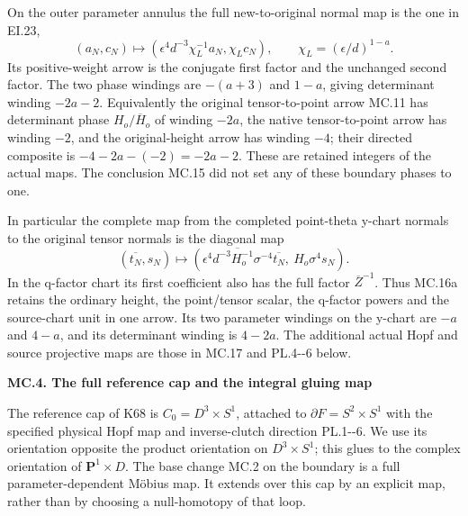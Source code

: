 On the outer parameter annulus the full new-to-original
normal map is the one in EI.23,
\[
 (a_N,c_N)\longmapsto
 (\epsilon^4d^{-3}\chi_L^{-1}a_N,\chi_Lc_N),
 \qquad\chi_L=(\epsilon/d)^{1-a}.                       \tag{MC.16}
\]
Its positive-weight arrow is the conjugate first factor
and the unchanged second factor. The two phase windings
are \(-(a+3)\) and \(1-a\), giving determinant winding
\(-2a-2\). Equivalently the original tensor-to-point
arrow MC.11 has determinant phase \(H_o/\overline H_o\)
of winding \(-2a\), the native tensor-to-point arrow
has winding \(-2\), and the original-height arrow has
winding \(-4\); their directed composite is
\(-4-2a-(-2)=-2a-2\). These are retained integers of
the actual maps. The conclusion MC.15 did not set any
of these boundary phases to one.

In particular the complete map from the completed
point-theta y-chart normals to the original tensor
normals is the diagonal map
\[
 (\overline{t_N},s_N)\longmapsto
 \left(\overline{\epsilon^4d^{-3}H_o^{-1}\sigma^{-4}}
                  \overline{t_N},\ H_o\sigma^4s_N\right).
                                                        \tag{MC.16a}
\]
In the q-factor chart its first coefficient also has
the full factor \(\overline Z^{-1}\). Thus MC.16a
retains the ordinary height, the point/tensor scalar,
the q-factor powers and the source-chart unit in one
arrow. Its two parameter windings on the y-chart
are \(-a\) and \(4-a\), and its determinant winding
is \(4-2a\). The additional actual Hopf and source
projective maps are those in MC.17 and PL.4-\/-6 below.

\par

\medskip\noindent\textbf{MC.4. The full reference cap and the integral gluing map}

\par\nobreak

The reference cap of K68 is \(C_0=D^3\times S^1\), attached
to \(\partial F=S^2\times S^1\) with the specified physical
Hopf map and inverse-clutch direction PL.1-\/-6. We use its
orientation opposite the product orientation on
\(D^3\times S^1\); this glues to the complex orientation
of \(\mathbf P^1\times D\). The base change MC.2 on
the boundary is a full parameter-dependent Möbius map.
It extends over this cap by an explicit map, rather
than by choosing a null-homotopy of that loop.

